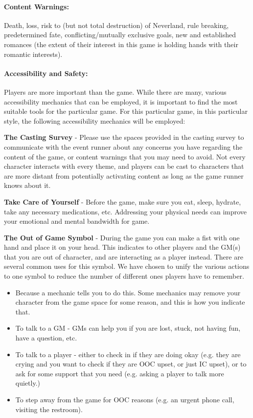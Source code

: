 \documentclass[sheet]{PP}
\begin{document}
\paragraph{Content Warnings:} Death, loss, risk to (but not total destruction) of Neverland, rule breaking, predetermined fate, conflicting/mutually exclusive goals, new and established romances (the extent of their interest in this game is holding hands with their romantic interests).

\paragraph{Accessibility and Safety:} Players are more important than the game. While there are many, various accessibility mechanics that can be employed, it is important to find the most suitable tools for the particular game. For this particular game, in this particular style, the following accessibility mechanics will be employed:
\begin{itemz}
	\item \textbf{The Casting Survey} - Please use the spaces provided in the casting survey to communicate with the event runner about any concerns you have regarding the content of the game, or content warnings that you may need to avoid. Not every character interacts with every theme, and players can be cast to characters that are more distant from potentially activating content as long as the game runner knows about it.
	\item \textbf{Take Care of Yourself }- Before the game, make sure you eat, sleep, hydrate, take any necessary medications, etc. Addressing your physical needs can improve your emotional and mental bandwidth for game.
\end{itemz}
\begin{itemz}
	\item \textbf{The Out of Game Symbol} - During the game you can make a fist with one hand and place it on your head. This indicates to other players and the GM(s) that you are out of character, and are interacting as a player instead. There are several common uses for this symbol. We have chosen to unify the various actions to one symbol to reduce the number of different ones players have to remember.
	\begin{itemize}
		\item Because a mechanic tells you to do this. Some mechanics may remove your character from the game space for some reason, and this is how you indicate that.
		\item To talk to a GM - GMs can help you if you are lost, stuck, not having fun, have a question, etc.
		\item To talk to a player - either to check in if they are doing okay (e.g. they are crying and you want to check if they are OOC upset, or just IC upset), or to ask for some support that you need (e.g. asking a player to talk more quietly.)
		\item To step away from the game for OOC reasons (e.g. an urgent phone call, visiting the restroom).
	\end{itemize}
\end{itemz}
\end{document}
